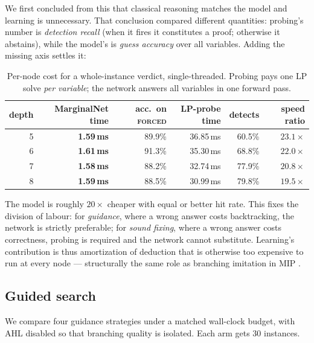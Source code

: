 \documentclass[12pt]{article}
\begin{document}
We first concluded from this that classical reasoning matches the model and learning is unnecessary. That conclusion compared different quantities: probing's number is \emph{detection recall} (when it fires it constitutes a proof; otherwise it abstains), while the model's is \emph{guess accuracy} over all variables. Adding the missing axis settles it:

\begin{table}[h]
\centering
\begin{tabular}{rrrrrr}
\toprule
depth & MarginalNet time & acc.\ on \textsc{forced} & LP-probe time & detects & speed ratio \\
\midrule
5 & \textbf{1.59\,ms} & 89.9\% & 36.85\,ms & 60.5\% & $23.1\times$ \\
6 & \textbf{1.61\,ms} & 91.3\% & 35.30\,ms & 68.8\% & $22.0\times$ \\
7 & \textbf{1.58\,ms} & 88.2\% & 32.74\,ms & 77.9\% & $20.8\times$ \\
8 & \textbf{1.59\,ms} & 88.5\% & 30.99\,ms & 79.8\% & $19.5\times$ \\
\bottomrule
\end{tabular}
\caption{Per-node cost for a whole-instance verdict, single-threaded. Probing pays one LP solve \emph{per variable}; the network answers all variables in one forward pass.}
\label{tab:cost}
\end{table}

The model is roughly $20\times$ cheaper with equal or better hit rate. This fixes the division of labour: for \emph{guidance}, where a wrong answer costs backtracking, the network is strictly preferable; for \emph{sound fixing}, where a wrong answer costs correctness, probing is required and the network cannot substitute. Learning's contribution is thus amortization of deduction that is otherwise too expensive to run at every node --- structurally the same role as branching imitation in MIP \citep{gasse2019exact}.

\subsection{Guided search}
\label{sec:search}

We compare four guidance strategies under a matched wall-clock budget, with AHL disabled so that branching quality is isolated. Each arm gets $30$ instances.
\end{document}
